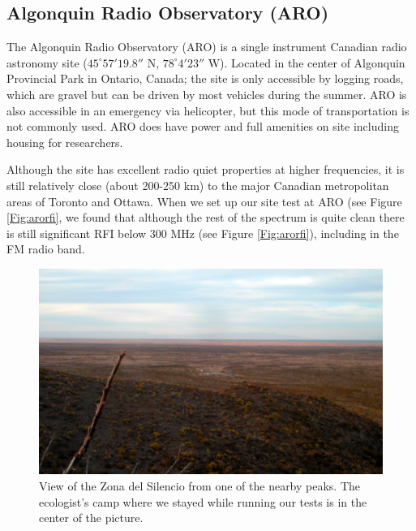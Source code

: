 \subsection{Algonquin Radio Observatory (ARO)}

The Algonquin Radio Observatory (ARO) is a single instrument Canadian radio astronomy site ($45^\circ 57' 19.8''$ N, $78^\circ 4' 23''$ W). Located in the center of Algonquin Provincial Park in Ontario, Canada; the site is only accessible by logging roads, which are gravel but can be driven by most vehicles during the summer. ARO is also accessible in an emergency via helicopter, but this mode of transportation is not commonly used. ARO does have power and full amenities on site including housing for researchers. 

Although the site has excellent radio quiet properties at higher frequencies, it is still relatively close (about 200-250 km) to the major Canadian metropolitan areas of Toronto and Ottawa. When we set up our site test at ARO (see Figure \ref{Fig:arorfi}, we found that although the rest of the spectrum is quite clean there is still significant RFI below 300 MHz (see Figure \ref{Fig:arorfi}), including in the FM radio band. 


\begin{figure}[htb]
\begin{center}
\includegraphics[width=0.9\linewidth]{RFI_testing/figures/zds_overview_shot.jpg}
\caption{View of the Zona del Silencio from one of the nearby peaks. The ecologist's camp where we stayed while running our tests is in the center of the picture.}
\label{Fig:zdsover}
\end{center}
\end{figure}

